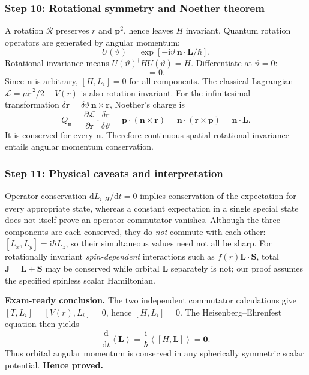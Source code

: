 \documentclass[11pt,a4paper]{article}
\newcommand{\dd}{\mathrm{d}}
\newcommand{\iu}{\mathrm{i}}
\newcommand{\avg}[1]{\left\langle #1\right\rangle}
\newcommand{\p}{\partial}
\begin{document}
\subsubsection*{Step 10: Rotational symmetry and Noether theorem}
A rotation \(\mathcal R\) preserves \(r\) and \(\mathbf p^2\), hence leaves \(H\) invariant. Quantum rotation operators are generated by angular momentum:
\begin{equation}U(\vartheta)=\exp[-\iu\vartheta\,\mathbf n\cdot\mathbf L/\hbar].\end{equation}
Rotational invariance means \(U(\vartheta)^\dagger H U(\vartheta)=H\). Differentiate at \(\vartheta=0\):
\begin{equation}[H,\mathbf n\cdot\mathbf L]=0.\end{equation}
Since \(\mathbf n\) is arbitrary, \([H,L_i]=0\) for all components. The classical Lagrangian \(\mathscr L=\mu\dot{\mathbf r}^{\,2}/2-V(r)\) is also rotation invariant. For the infinitesimal transformation \(\delta\mathbf r=\delta\vartheta\,\mathbf n\times\mathbf r\), Noether's charge is
\begin{equation}Q_{\mathbf n}=\frac{\p\mathscr L}{\p\dot{\mathbf r}}\cdot\frac{\delta\mathbf r}{\delta\vartheta}=\mathbf p\cdot(\mathbf n\times\mathbf r)=\mathbf n\cdot(\mathbf r\times\mathbf p)=\mathbf n\cdot\mathbf L.\end{equation}
It is conserved for every \(\mathbf n\). Therefore continuous spatial rotational invariance entails angular momentum conservation.

\subsubsection*{Step 11: Physical caveats and interpretation}
Operator conservation \(\dd L_{i,H}/\dd t=0\) implies conservation of the expectation for every appropriate state, whereas a constant expectation in a single special state does not itself prove an operator commutator vanishes. Although the three components are each conserved, they do \emph{not} commute with each other: \([L_x,L_y]=\iu\hbar L_z\), so their simultaneous values need not all be sharp. For rotationally invariant \emph{spin-dependent} interactions such as \(f(r)\mathbf L\cdot\mathbf S\), total \(\mathbf J=\mathbf L+\mathbf S\) may be conserved while orbital \(\mathbf L\) separately is not; our proof assumes the specified spinless scalar Hamiltonian.

\textbf{Exam-ready conclusion.} The two independent commutator calculations give \([T,L_i]=[V(r),L_i]=0\), hence \([H,L_i]=0\). The Heisenberg--Ehrenfest equation then yields
\begin{equation}\boxed{\frac{\dd}{\dd t}\avg{\mathbf L}=\frac{\iu}{\hbar}\avg{[H,\mathbf L]}=\mathbf0.}\end{equation}
Thus orbital angular momentum is conserved in any spherically symmetric scalar potential. \textbf{Hence proved.}
\end{document}
